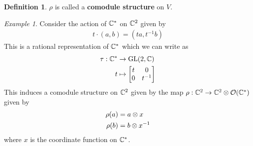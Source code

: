 \documentclass{amsart}
\numberwithin{equation}{section}
\theoremstyle{plain} %
\theoremstyle{definition}
\newtheorem{definition}[equation]{Definition}
\theoremstyle{remark}
\newtheorem{example}[equation]{Example}
\begin{document}
\begin{definition}
	$\rho$ is called a \textbf{comodule structure} on $V$.
\end{definition}

\begin{example}
	Consider the action of $\mathbb{C}^*$ on $\mathbb{C}^2$ given by
	\begin{align*}
		t\cdot (a,b) = (ta, t^{-1}b)
	\end{align*} This is a rational representation of $\mathbb{C}^*$ which we can write as
	\begin{align*}
		\tau:\mathbb{C}^* & \to \operatorname{GL}(2,\mathbb{C})          \\
		t            & \mapsto \begin{bmatrix}
			                       t & 0       \\
			                       0 & {t}^{-1}
		                       \end{bmatrix}
	\end{align*} This induces a comodule structure on $\mathbb{C}^2$ given by the map $\rho: \mathbb{C}^2\to \mathbb{C}^2\otimes \mathcal{O}(\mathbb{C}^*)$ given by
	\begin{align*}
		\rho(a) & = a\otimes x       \\
		\rho(b) & = b\otimes {x}^{-1}
	\end{align*} where $x$ is the coordinate function on $\mathbb{C}^*$.
\end{example}
\end{document}
